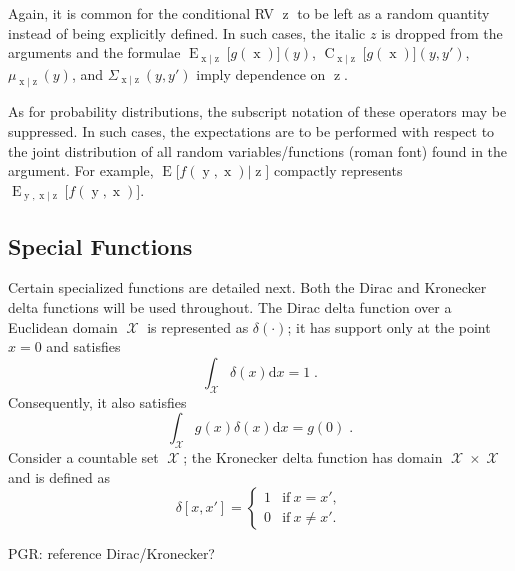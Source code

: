 \documentclass[12pt]{report}
\DeclareMathOperator{\xrm}{\mathrm{x}}
\DeclareMathOperator{\yrm}{\mathrm{y}}
\DeclareMathOperator{\zrm}{\mathrm{z}}
\DeclareMathOperator{\Erm}{\mathrm{E}}
\DeclareMathOperator{\Crm}{\mathrm{C}}
\DeclareMathOperator{\Xcal}{\mathcal{X}}
\begin{document}
Again, it is common for the conditional RV $\zrm$ to be left as a random quantity instead of being explicitly defined. In such cases, the italic $z$ is dropped from the arguments and the formulae $\Erm_{\xrm|\zrm}\big[ g(\xrm) \big](y)$, $\Crm_{\xrm|\zrm}\big[g(\xrm)\big](y,y')$, $\mu_{\xrm|\zrm}(y)$, and $\Sigma_{\xrm|\zrm}(y,y')$ imply dependence on $\zrm$.

As for probability distributions, the subscript notation of these operators may be suppressed. In such cases, the expectations are to be performed with respect to the joint distribution of all random variables/functions (roman font) found in the argument. For example, $\Erm\big[f(\yrm,\xrm) | \zrm \big]$ compactly represents $\Erm_{\yrm,\xrm | \zrm}\big[f(\yrm,\xrm)\big]$.


\subsection*{Special Functions}

Certain specialized functions are detailed next. Both the Dirac and Kronecker delta functions will be used throughout. The Dirac delta function over a Euclidean domain $\Xcal$ is represented as $\delta(\cdot)$; it has support only at the point $x=0$ and satisfies
\begin{equation}
\int_{\Xcal} \delta(x) \mathrm{d}x = 1 \;.
\end{equation}
Consequently, it also satisfies
\begin{equation}
\int_{\Xcal} g(x) \delta(x) \mathrm{d}x = g(0) \;.
\end{equation}
Consider a countable set $\Xcal$; the Kronecker delta function has domain $\Xcal \times \Xcal$ and is defined as
\begin{equation}
\delta[x,x'] = \begin{cases} 1 & \mathrm{if} \ x = x', \\ 0 & \mathrm{if} \ x \neq x'.  \end{cases}
\end{equation}

PGR: reference Dirac/Kronecker?
\end{document}
